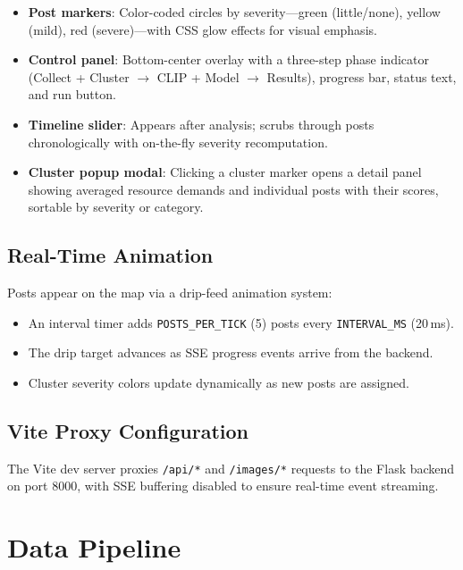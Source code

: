 \documentclass[11pt,a4paper]{article}
\begin{document}
\begin{itemize}
    \item \textbf{Post markers}: Color-coded circles by severity---green (little/none), yellow (mild), red (severe)---with CSS glow effects for visual emphasis.
    \item \textbf{Control panel}: Bottom-center overlay with a three-step phase indicator (Collect + Cluster $\rightarrow$ CLIP + Model $\rightarrow$ Results), progress bar, status text, and run button.
    \item \textbf{Timeline slider}: Appears after analysis; scrubs through posts chronologically with on-the-fly severity recomputation.
    \item \textbf{Cluster popup modal}: Clicking a cluster marker opens a detail panel showing averaged resource demands and individual posts with their scores, sortable by severity or category.
\end{itemize}

\subsection{Real-Time Animation}

Posts appear on the map via a drip-feed animation system:
\begin{itemize}
    \item An interval timer adds \texttt{POSTS\_PER\_TICK} (5) posts every \texttt{INTERVAL\_MS} (20\,ms).
    \item The drip target advances as SSE progress events arrive from the backend.
    \item Cluster severity colors update dynamically as new posts are assigned.
\end{itemize}

\subsection{Vite Proxy Configuration}

The Vite dev server proxies \texttt{/api/*} and \texttt{/images/*} requests to the Flask backend on port 8000, with SSE buffering disabled to ensure real-time event streaming.

\newpage
\section{Data Pipeline}
\end{document}
